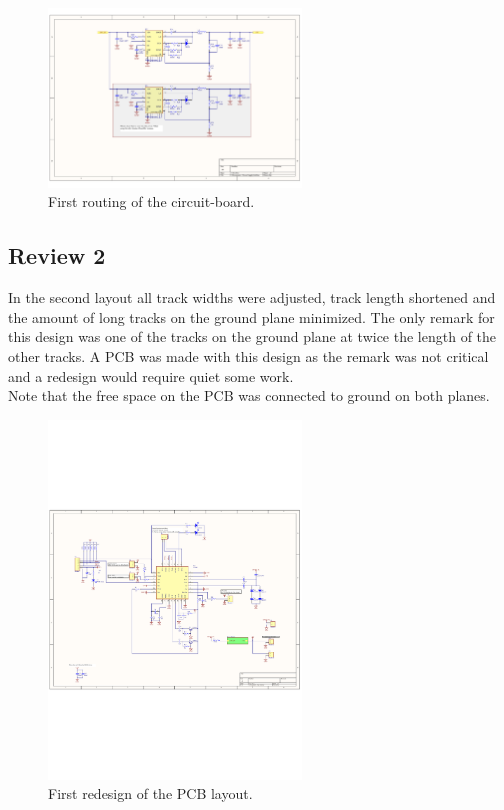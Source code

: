 \begin{figure}[H]
	\begin{centering}
		 \includegraphics[width=0.6\textwidth,page=3,angle=0]{images/SIG60_v0_1}
		\caption{First routing of the circuit-board.}
	\end{centering}
\end{figure}

\subsection{Review 2}
In the second layout all track widths were adjusted, track length shortened and the amount of long tracks on the ground plane minimized. The only remark for this design was one of the tracks on the ground plane at twice the length of the other tracks. A PCB was made with this design as the remark was not critical and a redesign would require quiet some work.
\\Note that the free space on the PCB was connected to ground on both planes. 
\begin{figure}[H]
	\begin{centering}
		 \includegraphics[width=0.6\textwidth,page=3,angle=0]{images/SIG60_v0_2}
		\caption{First redesign of the PCB layout.}
	\end{centering}
\end{figure}
